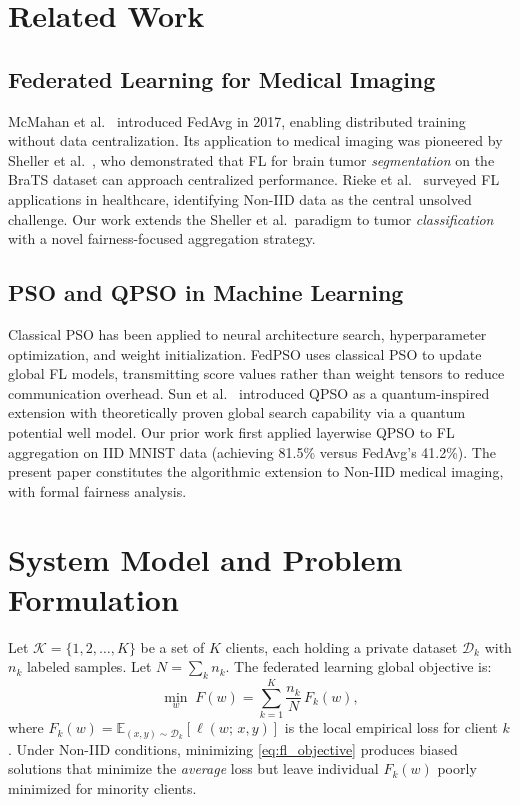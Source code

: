 \documentclass[conference]{IEEEtran}
\begin{document}
\section{Related Work}
\label{sec:related}

\subsection{Federated Learning for Medical Imaging}
McMahan et al.\ \cite{mcmahan2017} introduced FedAvg in 2017, enabling
distributed training without data centralization. Its application to medical
imaging was pioneered by Sheller et al.\ \cite{sheller2018}, who demonstrated
that FL for brain tumor \emph{segmentation} on the BraTS dataset can approach
centralized performance. Rieke et al.\ \cite{rieke2020} surveyed FL
applications in healthcare, identifying Non-IID data as the central unsolved
challenge. Our work extends the Sheller et al.\ paradigm to tumor
\emph{classification} with a novel fairness-focused aggregation strategy.

\subsection{PSO and QPSO in Machine Learning}
Classical PSO \cite{kennedy1995} has been applied to neural architecture
search, hyperparameter optimization, and weight initialization. FedPSO
\cite{fedpso2021} uses classical PSO to update global FL models, transmitting
score values rather than weight tensors to reduce communication overhead. Sun
et al.\ \cite{sun2004qpso} introduced QPSO as a quantum-inspired extension
with theoretically proven global search capability via a quantum potential
well model. Our prior work \cite{edla2025mnist} first applied layerwise QPSO
to FL aggregation on IID MNIST data (achieving 81.5\% versus FedAvg's
41.2\%). The present paper constitutes the algorithmic extension to Non-IID
medical imaging, with formal fairness analysis.

\section{System Model and Problem Formulation}
\label{sec:problem}

Let $\mathcal{K} = \{1, 2, \ldots, K\}$ be a set of $K$ clients, each
holding a private dataset $\mathcal{D}_k$ with $n_k$ labeled samples. Let $N
= \sum_k n_k$. The federated learning global objective is:
\begin{equation}
    \min_{w}\; F(w) = \sum_{k=1}^{K} \frac{n_k}{N}\, F_k(w),
    \label{eq:fl_objective}
\end{equation}
where $F_k(w) = \mathbb{E}_{(x,y)\sim\mathcal{D}_k}[\ell(w;\,x,y)]$ is the
local empirical loss for client $k$. Under Non-IID conditions, minimizing
\eqref{eq:fl_objective} produces biased solutions that minimize the
\emph{average} loss but leave individual $F_k(w)$ poorly minimized for
minority clients.
\end{document}
